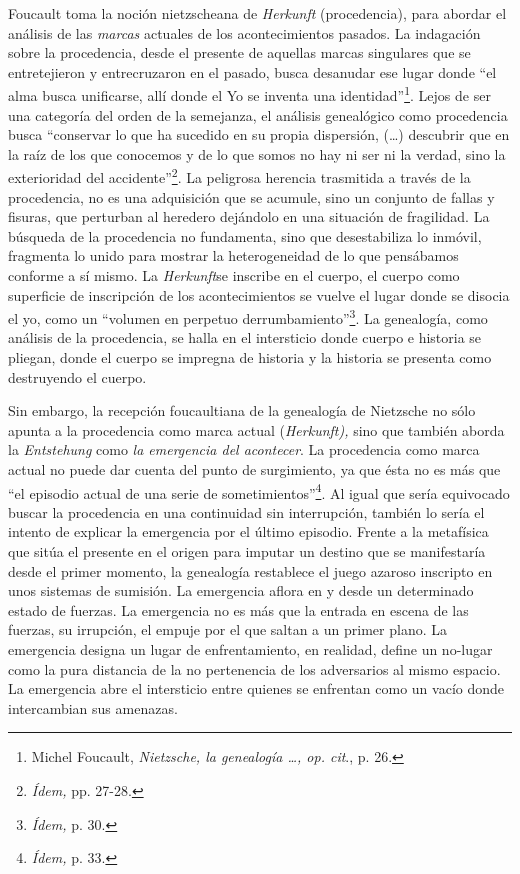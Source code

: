 Foucault toma la noción nietzscheana de \emph{Herkunft} (procedencia), para abordar el análisis de las \emph{marcas} actuales de los acontecimientos pasados. La indagación sobre la procedencia, desde el presente de aquellas marcas singulares que se entretejieron y entrecruzaron en el pasado, busca desanudar ese lugar donde \enquote{el alma busca unificarse, allí donde el Yo se inventa una identidad}\footnote{Michel Foucault, \emph{Nietzsche, la genealogía \ldots, op. cit}., p. 26.}. Lejos de ser una categoría del orden de la semejanza, el análisis genealógico como procedencia busca \enquote{conservar lo que ha sucedido en su propia dispersión, (\dots) descubrir que en la raíz de los que conocemos y de lo que somos no hay ni ser ni la verdad, sino la exterioridad del accidente}\footnote{\emph{Ídem,} pp. 27-28.}. La peligrosa herencia trasmitida a través de la procedencia, no es una adquisición que se acumule, sino un conjunto de fallas y fisuras, que perturban al heredero dejándolo en una situación de fragilidad. La búsqueda de la procedencia no fundamenta, sino que desestabiliza lo inmóvil, fragmenta lo unido para mostrar la heterogeneidad de lo que pensábamos conforme a sí mismo. La \emph{Herkunft}se inscribe en el cuerpo, el cuerpo como superficie de inscripción de los acontecimientos se vuelve el lugar donde se disocia el yo, como un \enquote{volumen en perpetuo derrumbamiento}\footnote{\emph{Ídem,} p. 30.}. La genealogía, como análisis de la procedencia, se halla en el intersticio donde cuerpo e historia se pliegan, donde el cuerpo se impregna de historia y la historia se presenta como destruyendo el cuerpo.

Sin embargo, la recepción foucaultiana de la genealogía de Nietzsche no sólo apunta a la procedencia como marca actual (\emph{Herkunft),} sino que también aborda la \emph{Entstehung} como \emph{la emergencia del acontecer}. La procedencia como marca actual no puede dar cuenta del punto de surgimiento, ya que ésta no es más que \enquote{el episodio actual de una serie de sometimientos}\footnote{\emph{Ídem,} p. 33.}. Al igual que sería equivocado buscar la procedencia en una continuidad sin interrupción, también lo sería el intento de explicar la emergencia por el último episodio. Frente a la metafísica que sitúa el presente en el origen para imputar un destino que se manifestaría desde el primer momento, la genealogía restablece el juego azaroso inscripto en unos sistemas de sumisión. La emergencia aflora en y desde un determinado estado de fuerzas. La emergencia no es más que la entrada en escena de las fuerzas, su irrupción, el empuje por el que saltan a un primer plano. La emergencia designa un lugar de enfrentamiento, en realidad, define un no-lugar como la pura distancia de la no pertenencia de los adversarios al mismo espacio. La emergencia abre el intersticio entre quienes se enfrentan como un vacío donde intercambian sus amenazas.

